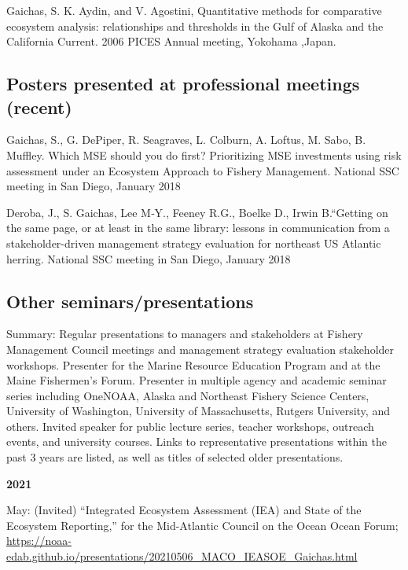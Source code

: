 \documentclass[11pt, a4paper]{awesome-cv}
\begin{document}
Gaichas, S. K. Aydin, and V. Agostini, Quantitative methods for
comparative ecosystem analysis: relationships and thresholds in the Gulf
of Alaska and the California Current. 2006 PICES Annual meeting,
Yokohama ,Japan.

\hypertarget{posters-presented-at-professional-meetings-recent}{%
\subsection{Posters presented at professional meetings
(recent)}\label{posters-presented-at-professional-meetings-recent}}

Gaichas, S., G. DePiper, R. Seagraves, L. Colburn, A. Loftus, M. Sabo,
B. Muffley. Which MSE should you do first? Prioritizing MSE investments
using risk assessment under an Ecosystem Approach to Fishery Management.
National SSC meeting in San Diego, January 2018

Deroba, J., S. Gaichas, Lee M‐Y., Feeney R.G., Boelke D., Irwin
B.``Getting on the same page, or at least in the same library: lessons
in communication from a stakeholder-driven management strategy
evaluation for northeast US Atlantic herring. National SSC meeting in
San Diego, January 2018

\hypertarget{other-seminarspresentations}{%
\subsection{Other
seminars/presentations}\label{other-seminarspresentations}}

Summary: Regular presentations to managers and stakeholders at Fishery
Management Council meetings and management strategy evaluation
stakeholder workshops. Presenter for the Marine Resource Education
Program and at the Maine Fishermen's Forum. Presenter in multiple agency
and academic seminar series including OneNOAA, Alaska and Northeast
Fishery Science Centers, University of Washington, University of
Massachusetts, Rutgers University, and others. Invited speaker for
public lecture series, teacher workshops, outreach events, and
university courses. Links to representative presentations within the
past 3 years are listed, as well as titles of selected older
presentations.

\textbf{2021}

May: (Invited) ``Integrated Ecosystem Assessment (IEA) and State of the
Ecosystem Reporting,'' for the Mid-Atlantic Council on the Ocean Ocean
Forum;
\url{https://noaa-edab.github.io/presentations/20210506_MACO_IEASOE_Gaichas.html}
\end{document}
